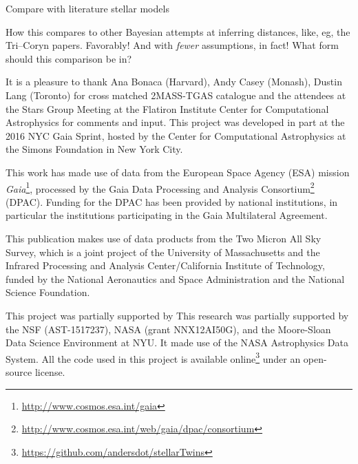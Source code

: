 \documentclass[modern]{aastex61}
\newcommand{\acronym}[1]{{\small{#1}}}
\newcommand{\project}[1]{\textsl{#1}}
\newcommand{\gaia}{\project{Gaia}}
\begin{document}
Compare with literature stellar models

How this compares to other Bayesian attempts at inferring distances,
like, eg, the Tri--Coryn papers. Favorably! And with \emph{fewer}
assumptions, in fact! What form should this comparison be in?

\acknowledgments It is a pleasure to thank
  Ana Bonaca (Harvard),
  Andy Casey (Monash),
  Dustin Lang (Toronto) for cross matched 2MASS-TGAS catalogue
and the attendees at the Stars Group Meeting at the Flatiron Institute
Center for Computational Astrophysics for comments and input.
This project was developed in part at the 2016 \acronym{NYC} Gaia Sprint, hosted
by the Center for Computational Astrophysics at the Simons Foundation
in New York City.

This work has made use of data from the European Space Agency (\acronym{ESA})
mission \gaia\footnote{\url{http://www.cosmos.esa.int/gaia}}, processed by the Gaia
Data Processing and Analysis Consortium\footnote{\url{http://www.cosmos.esa.int/web/gaia/dpac/consortium}} (\acronym{DPAC}). Funding for the
\acronym{DPAC} has been provided by national institutions, in particular the
institutions participating in the Gaia Multilateral Agreement.

This publication makes use of data products from the Two Micron All
Sky Survey, which is a joint project of the
University of Massachusetts and the Infrared Processing and Analysis
Center/California Institute of Technology, funded by the National
Aeronautics and Space Administration and the National Science
Foundation.

This project was partially supported by This research was partially supported by
  the \acronym{NSF} (\acronym{AST-1517237}),
  \acronym{NASA} (grant \acronym{NNX12AI50G}),
  and the Moore-Sloan Data Science Environment at \acronym{NYU}.
It made use of the \acronym{NASA} Astrophysics Data System.
All the code used in this project is available online\footnote{\url{https://github.com/andersdot/stellarTwins}} under an open-source license.




\clearpage
\end{document}
